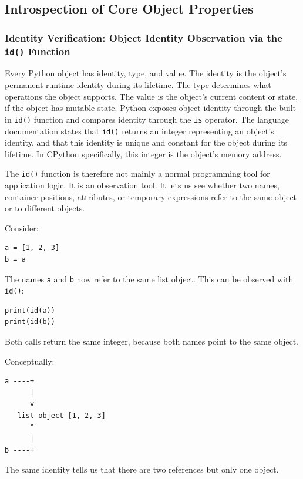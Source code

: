 \subsection{Introspection of Core Object Properties}


\subsubsection{Identity Verification: Object Identity Observation via the \texttt{id()} Function}

Every Python object has identity, type, and value. The identity is the object's permanent runtime identity during its lifetime. The type determines what operations the object supports. The value is the object's current content or state, if the object has mutable state. Python exposes object identity through the built-in \texttt{id()} function and compares identity through the \texttt{is} operator. The language documentation states that \texttt{id()} returns an integer representing an object's identity, and that this identity is unique and constant for the object during its lifetime. In CPython specifically, this integer is the object's memory address. \cite{python_datamodel_objects} \cite{python_builtin_id}

The \texttt{id()} function is therefore not mainly a normal programming tool for application logic. It is an observation tool. It lets us see whether two names, container positions, attributes, or temporary expressions refer to the same object or to different objects.

Consider:

\begin{verbatim}
a = [1, 2, 3]
b = a
\end{verbatim}

The names \texttt{a} and \texttt{b} now refer to the same list object. This can be observed with \texttt{id()}:

\begin{verbatim}
print(id(a))
print(id(b))
\end{verbatim}

Both calls return the same integer, because both names point to the same object.

Conceptually:

\begin{verbatim}
a ----+
      |
      v
   list object [1, 2, 3]
      ^
      |
b ----+
\end{verbatim}

The same identity tells us that there are two references but only one object.

